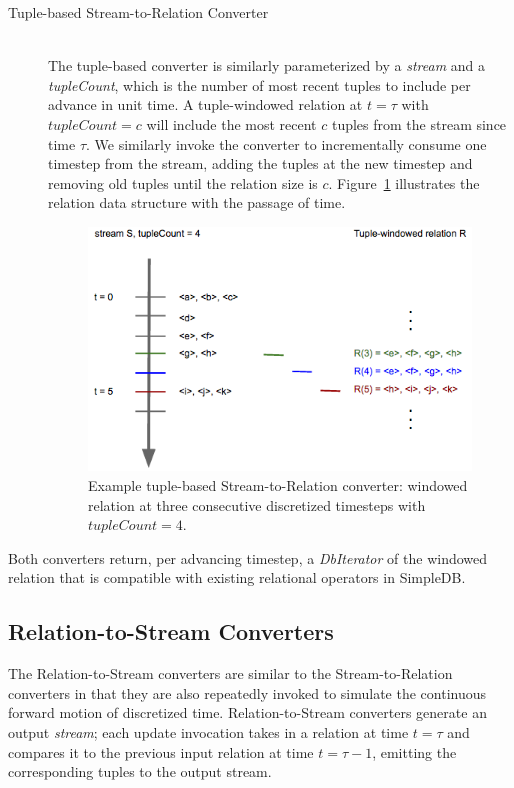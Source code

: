 \documentclass[a4paper, 10pt, conference]{IEEEconf}
\begin{document}
\begin{description}
    \item[Tuple-based Stream-to-Relation Converter] \hfill \\
    The tuple-based converter is similarly parameterized by a \textit{stream} and a \textit{tupleCount}, which is the number of most recent tuples to include per advance in unit time. A tuple-windowed relation at $t = \tau$ with $tupleCount = c$ will include the most recent $c$ tuples from the stream since time $\tau$. We similarly invoke the converter to incrementally consume one timestep from the stream, adding the tuples at the new timestep and removing old tuples until the relation size is $c$. Figure~\ref{fig:tuple_window} illustrates the relation data structure with the passage of time. 

    \begin{figure}[h!]
        \centering
        \centerline{\includegraphics[totalheight=4cm]{tuple_window.png}}
        \caption{Example tuple-based Stream-to-Relation converter: windowed relation at three consecutive discretized timesteps with $tupleCount = 4$.}
        \label{fig:tuple_window}
    \end{figure}
  
\end{description}

Both converters return, per advancing timestep, a \textit{DbIterator} of the windowed relation that is compatible with existing relational operators in SimpleDB.

\subsection{Relation-to-Stream Converters}
The Relation-to-Stream converters are similar to the Stream-to-Relation converters in that they are also repeatedly invoked to simulate the continuous forward motion of discretized time. Relation-to-Stream converters generate an output \textit{stream}; each update invocation takes in a relation at time $t = \tau$ and compares it to the previous input relation at time $t = \tau - 1$, emitting the corresponding tuples to the output stream. 
\end{document}
